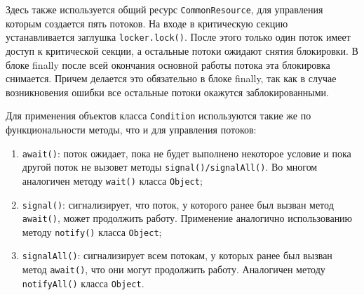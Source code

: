 Здесь также используется общий ресурс \verb|CommonResource|, для управления которым создается пять потоков. На входе в критическую секцию устанавливается заглушка \verb|locker.lock()|. После этого только один поток имеет доступ к критической секции, а остальные потоки ожидают снятия блокировки. В блоке finally после всей окончания основной работы потока эта блокировка снимается. Причем делается это обязательно в блоке finally, так как в случае возникновения ошибки все остальные потоки окажутся заблокированными.

Для применения объектов класса \verb|Condition| используются такие же по функциональности методы, что и для управления потоков:

\begin{enumerate}
    \item \verb|await()|: поток ожидает, пока не будет выполнено некоторое условие и пока другой поток не вызовет методы \verb|signal()/signalAll()|. Во многом аналогичен методу \verb|wait()| класса \verb|Object|;
    \item \verb|signal()|: сигнализирует, что поток, у которого ранее был вызван метод \verb|await()|, может продолжить работу. Применение аналогично использованию методу \verb|notify()| класса \verb|Object|;
    \item \verb|signalAll()|: сигнализирует всем потокам, у которых ранее был вызван метод \verb|await()|, что они могут продолжить работу. Аналогичен методу \verb|notifyAll()| класса \verb|Object|.
\end{enumerate}

\label{pages_total}
